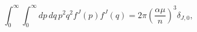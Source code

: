 \begin{equation}
\int_{0}^{\infty }\int_{0}^{\infty }dp\,dq\,p^{2}q^{2}f^{J}(p)f^{J}(q)=2\pi
\left( \frac{\alpha \mu }{n}\right) ^{3}\delta _{J,0},
\end{equation}

